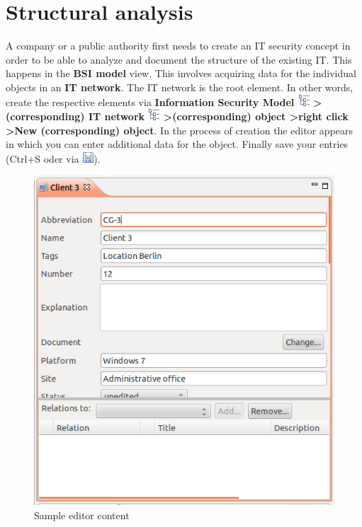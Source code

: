 \documentclass[a4paper,10pt]{book}
\begin{document}
\section{Structural analysis} \label{sec:StructuralAnalysis}
A company or a public authority first needs to create an IT security concept in order to be able to analyze and document the structure of the existing IT. This happens in the \textbf{BSI model} view. This involves acquiring data for the individual objects in an \textbf{IT network}. The IT network is the root element.
In other words, create the respective elements via
\textbf{Information Security Model
\includegraphics[height=2ex]{Icon/GS_Modell.png} \textgreater (corresponding) IT network
\includegraphics[height=2ex]{Icon/GS_Modell.png} \textgreater (corresponding) object
\textgreater right click \textgreater New (corresponding) object}.
In the process of creation the editor appears in which you can enter additional data for the object. Finally save your entries (Ctrl+S oder via \includegraphics[height=2ex]{Icon/Disk.png}).
\newline
\begin{figure}[htb!]
  \centering
  \includegraphics[scale=.65]{Screenshot/Editor-View_GS_en.png}
  \caption{\label{Sample editor content} Sample editor content}
\end{figure}
\end{document}
